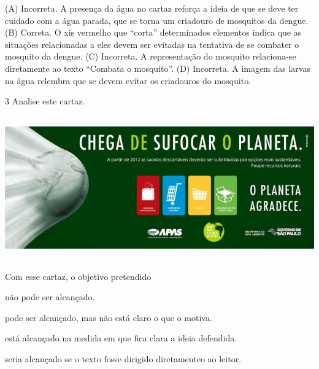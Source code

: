 
(A) Incorreta. A presença da água no cartaz reforça a ideia de que se deve ter cuidado com a água parada, que se torna um criadouro de mosquitos da dengue.
(B) Correta. O xis vermelho que ``corta'' determinados elementos indica que as situações relacionadas a eles devem ser evitadas na tentativa de se combater o mosquito da dengue.
(C) Incorreta. A representação do mosquito relaciona-se diretamente ao texto ``Combata o mosquito''.
(D) Incorreta. A imagem das larvas na água relembra que se devem evitar os criadouros do mosquito.

\num{3} Analise este cartaz.


\includegraphics[width=6.14514in,height=2.43088in]{./media/image14.jpeg}


Com esse cartaz, o objetivo pretendido

\begin{escolha}
\item não pode ser alcançado.

\item pode ser alcançado, mas não está claro o que o motiva.

\item está alcançado na medida em que fica clara a ideia defendida.

\item seria alcançado se o texto fosse dirigido diretamenteo ao leitor.
\end{escolha}

